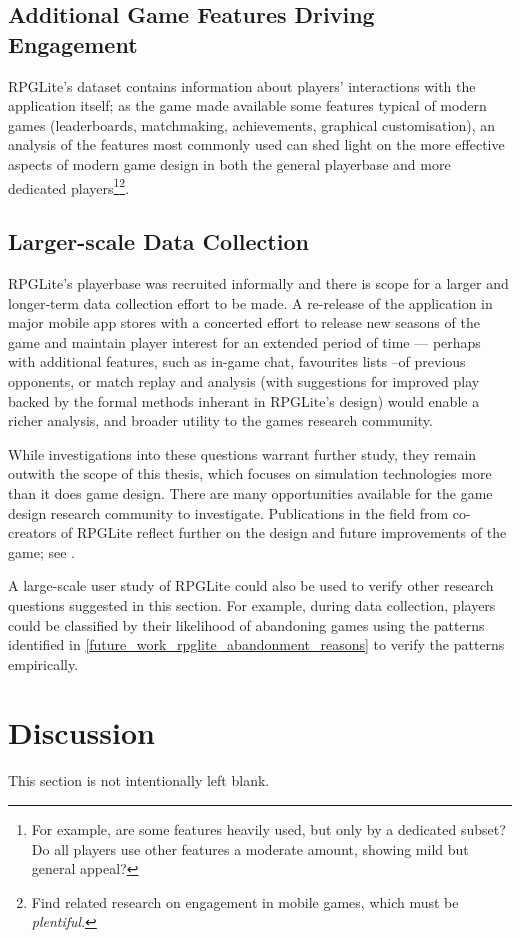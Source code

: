 \subsection{Additional Game Features Driving Engagement}
RPGLite's dataset contains information about players' interactions with the
application itself; as the game made available some features typical of modern
games (leaderboards, matchmaking, achievements, graphical customisation), an
analysis of the features most commonly used can shed light on the more effective
aspects of modern game design in both the general playerbase and more dedicated
players\footnote{For example, are some features heavily used, but only by a
dedicated subset? Do all players use other features a moderate amount, showing
mild but general appeal?}\footnote{Find related research on engagement in mobile
games, which must be \emph{plentiful}.}.
    

\subsection{Larger-scale Data Collection}
RPGLite's playerbase was recruited informally and there is scope for a larger
and longer-term data collection effort to be made. A re-release of the
application in major mobile app stores with a concerted effort to release new
seasons of the game and maintain player interest for an extended period of time
--- perhaps with additional features, such as in-game chat, favourites lists
--of previous opponents, or match replay and analysis (with suggestions for
improved play backed by the formal methods inherant in RPGLite's design) would
enable a richer analysis, and broader utility to the games research community.

While investigations into these questions warrant further study, they remain
outwith the scope of this thesis, which focuses on simulation technologies more
than it does game design. There are many opportunities available for the game
design research community to investigate. Publications in the field from
co-creators of RPGLite reflect further on the design and future improvements of
the game; see .

A large-scale user study of RPGLite could also be used to verify other research
questions suggested in this section. For example, during data collection,
players could be classified by their likelihood of abandoning games using the
patterns identified in \cref{future_work_rpglite_abandonment_reasons} to verify
the patterns empirically.



\section{Discussion}\label{sec:future_work_conclusion}

This section is not intentionally left blank.

